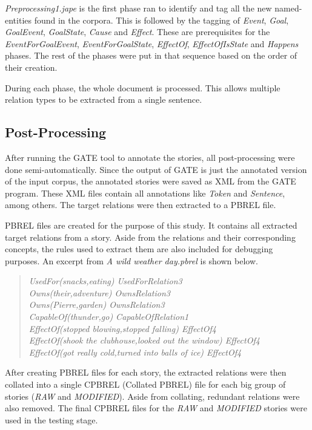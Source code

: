 \textit{Preprocessing1.jape} is the first phase ran to identify and tag all the new named-entities found in the corpora. This is followed by the tagging of \textit{Event}, \textit{Goal}, \textit{GoalEvent}, \textit{GoalState}, \textit{Cause} and \textit{Effect}. These are prerequisites for the \textit{EventForGoalEvent}, \textit{EventForGoalState}, \textit{EffectOf},  \textit{EffectOfIsState} and \textit{Happens} phases. The rest of the phases were put in that sequence based on the order of their creation.

During each phase, the whole document is processed. This allows multiple relation types to be extracted from a single sentence.

\subsection{Post-Processing}
\label{sec:postprocessing}

After running the GATE tool to annotate the stories, all post-processing were done semi-automatically. Since the output of GATE is just the annotated version of the input corpus, the annotated stories were saved as XML from the GATE program. These XML files contain all annotations like \textit{Token} and \textit{Sentence}, among others.  The target relations were then extracted to a PBREL file. 

PBREL files are created for the purpose of this study. It contains all extracted target relations from a story. Aside from the relations and their corresponding concepts, the rules used to extract them are also included for debugging purposes. An excerpt from \textit{A wild weather day.pbrel} is shown below.

\begin{verse}
\itshape
UsedFor(snacks,eating) UsedForRelation3 \\
Owns(their,adventure) OwnsRelation3\\
Owns(Pierre,garden) OwnsRelation3\\
CapableOf(thunder,go) CapableOfRelation1\\
EffectOf(stopped blowing,stopped falling) EffectOf4\\
EffectOf(shook the clubhouse,looked out the window) EffectOf4\\
EffectOf(got really cold,turned into balls of ice) EffectOf4\\
\end{verse}

After creating PBREL files for each story, the extracted relations were then collated into a single CPBREL (Collated PBREL) file for each big group of stories (\emph{RAW} and \emph{MODIFIED}). Aside from collating, redundant relations were also removed. The final CPBREL files for the \emph{RAW} and \emph{MODIFIED} stories were used in the testing stage.







